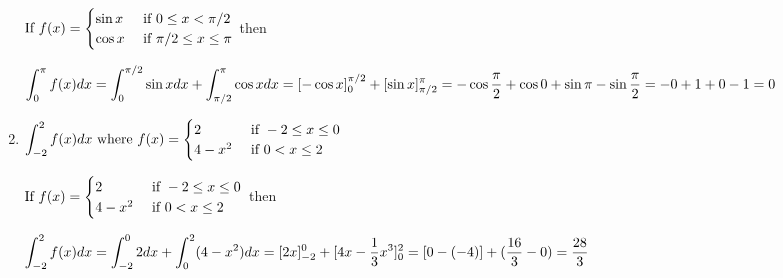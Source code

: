 \begin{enumerate}[1.]
\begin{Solution}
  $\displaystyle \text{If } f(x) = 
    \begin{cases}
      \sin x  & \text{ if } 0 \leq x < \pi / 2 \\
      \cos x  & \text{ if } \pi / 2 \leq x \leq \pi \\
    \end{cases}
    $ then
    
    $\displaystyle \int_{0}^{\pi} f(x) dx = 
    \int_0^{\pi/2} \sin x dx + \int_{\pi/2}^{\pi} \cos x dx =
    [ - \cos x]_0^{\pi/2} + [ \sin x ]_{\pi / 2}^{\pi} =
    - \cos \frac{\pi}{2} + \cos 0 + \sin \pi - \sin \frac{\pi}{2} = 
    -0 + 1 + 0 - 1 = 0$
\end{Solution}

\item \begin{Question}
    
$\displaystyle    \int_{-2}^2 f(x) dx \text{ where } f(x) = 
    \begin{cases}
      2  & \text{ if } -2 \leq x \leq 0 \\
      4 - x^2 & \text{ if } 0 < x \leq 2 \\
    \end{cases}
  $ 
\end{Question}

\begin{Solution}
  $\displaystyle \text{If } f(x) =
    \begin{cases}
      2  & \text{ if } -2 \leq x \leq 0 \\
      4 - x^2 & \text{ if } 0 < x \leq 2 \\
    \end{cases}
    $ then
    
    $\displaystyle \int_{-2}^{2} f(x) dx =
    \int_{-2}^{0} 2 dx + \int_0^2 (4 - x^2) dx = 
    [2x]_{-2}^{0} + [4x - \frac{1}{3} x^3 ]_0^2 =
    [0 - (-4)] + (\frac{16}{3} - 0) = \frac{28}{3}$
    
\end{Solution}



\end{enumerate}


\item
  \begin{Question}
    
  \end{Question}

  \begin{Solution}
    
  \end{Solution}
